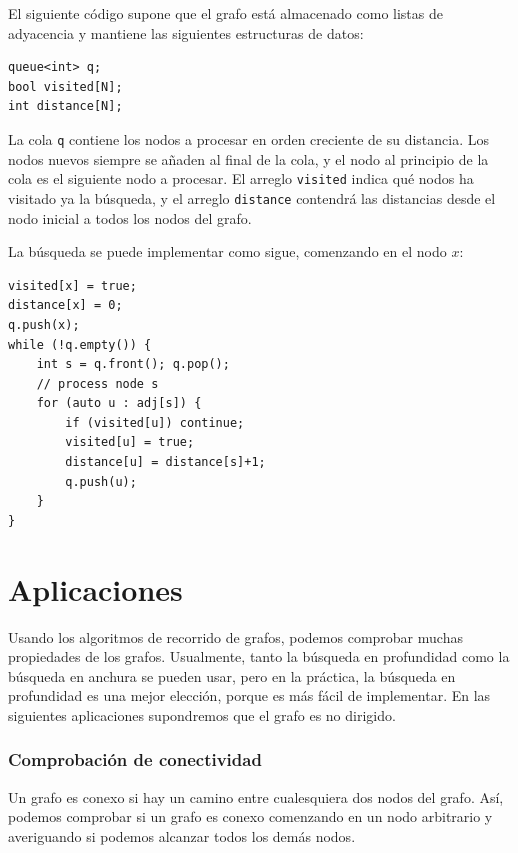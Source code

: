El siguiente código supone que el grafo está almacenado
como listas de adyacencia y mantiene las siguientes
estructuras de datos:
\begin{lstlisting}
queue<int> q;
bool visited[N];
int distance[N];
\end{lstlisting}

La cola \texttt{q}
contiene los nodos a procesar
en orden creciente de su distancia.
Los nodos nuevos siempre se añaden al final
de la cola, y el nodo al principio
de la cola es el siguiente nodo a procesar.
El arreglo \texttt{visited} indica
qué nodos ha visitado ya la búsqueda,
y el arreglo \texttt{distance} contendrá las
distancias desde el nodo inicial a todos los nodos del grafo.

La búsqueda se puede implementar como sigue,
comenzando en el nodo $x$:
\begin{lstlisting}
visited[x] = true;
distance[x] = 0;
q.push(x);
while (!q.empty()) {
    int s = q.front(); q.pop();
    // process node s
    for (auto u : adj[s]) {
        if (visited[u]) continue;
        visited[u] = true;
        distance[u] = distance[s]+1;
        q.push(u);
    }
}
\end{lstlisting}

\section{Aplicaciones}

Usando los algoritmos de recorrido de grafos,
podemos comprobar muchas propiedades de los grafos.
Usualmente, tanto la búsqueda en profundidad como
la búsqueda en anchura se pueden usar,
pero en la práctica, la búsqueda en profundidad
es una mejor elección, porque es
más fácil de implementar.
En las siguientes aplicaciones
supondremos que el grafo es no dirigido.

\subsubsection{Comprobación de conectividad}


Un grafo es conexo si hay un camino
entre cualesquiera dos nodos del grafo.
Así, podemos comprobar si un grafo es conexo
comenzando en un nodo arbitrario y
averiguando si podemos alcanzar todos los demás nodos.

